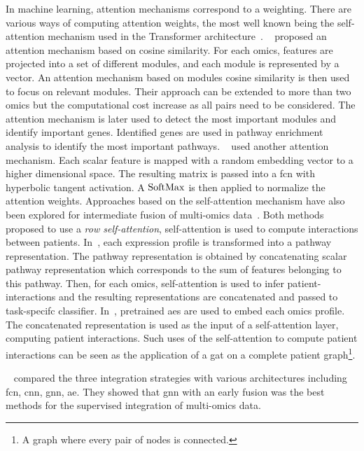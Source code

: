 \documentclass[../main.tex]{subfiles}
\begin{document}
	    In machine learning, attention mechanisms correspond to a weighting.
	    There are various ways of computing attention weights, the most well known being the self-attention mechanism used in the Transformer architecture~\cite{AttentionAllYouNeed}.
	    \citeauthor{MOMA}~\cite{MOMA} proposed an attention mechanism based on cosine similarity.
	    For each omics, features are projected into a set of different modules, and each module is represented by a vector.
	    An attention mechanism based on modules cosine similarity is then used to focus on relevant modules.
	    Their approach can be extended to more than two omics but the computational cost increase as all pairs need to be considered.
	    The attention mechanism is later used to detect the most important modules and identify important genes.
	    Identified genes are used in pathway enrichment analysis to identify the most important pathways.
	    \citeauthor{moBRCA}~\cite{moBRCA} used another attention mechanism.
	    Each scalar feature is mapped with a random embedding vector to a higher dimensional space.
	    The resulting matrix is passed into a \gls{fcn} with hyperbolic tangent activation.
	    A \(\operatorname{SoftMax}\) is then applied to normalize the attention weights.
	    Approaches based on the self-attention mechanism have also been explored for intermediate fusion of multi-omics data~\cite{Yao_2024,Lan2024}.
	    Both methods proposed to use a \emph{row self-attention}, self-attention is used to compute interactions between patients.
	    In~\cite{Lan2024}, each expression profile is transformed into a pathway representation.
	    The pathway representation is obtained by concatenating scalar pathway representation which corresponds to the sum of features belonging to this pathway.
	    Then, for each omics, self-attention is used to infer patient-interactions and the resulting representations are concatenated and passed to task-specifc classifier.
	    In~\cite{Yao_2024}, pretrained \glspl{ae} are used to embed each omics profile.
	    The concatenated representation is used as the input of a self-attention layer, computing patient interactions.
	    Such uses of the self-attention to compute patient interactions can be seen as the application of a \gls{gat} on a complete patient graph\footnote{A graph where every pair of nodes is connected.}.

	    \ifSubfilesClassLoaded{%
	    }{
	    }

	    \citeauthor{Leng2022}~\cite{Leng2022} compared the three integration strategies with various architectures including \gls{fcn}, \gls{cnn}, \gls{gnn}, \gls{ae}.
	    They showed that \gls{gnn} with an early fusion was the best methods for the supervised integration of multi-omics data.
\end{document}
